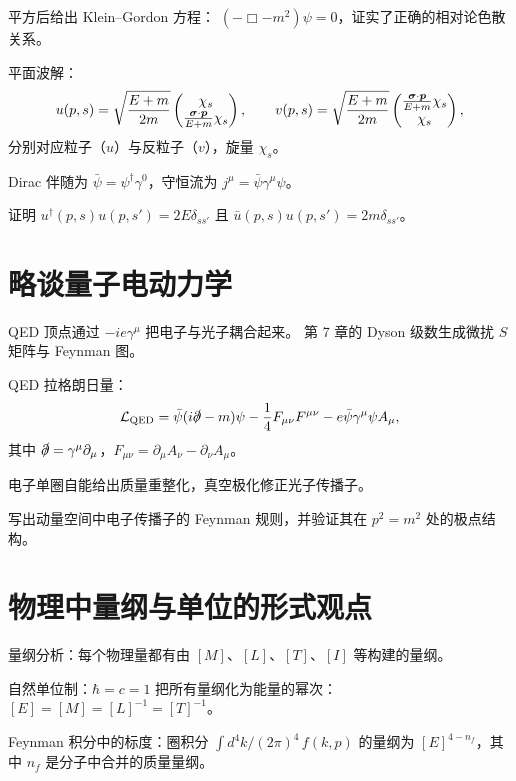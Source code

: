 平方后给出 Klein--Gordon 方程：
$(-\Box-m^2)\psi=0$，证实了正确的相对论色散关系。

平面波解：
\begin{equation}
u(p,s) = \sqrt{\frac{E+m}{2m}}
\begin{pmatrix}\chi_s\\\frac{\bm{\sigma}\cdot\bm{p}}{E+m}\chi_s\end{pmatrix},\qquad
v(p,s) = \sqrt{\frac{E+m}{2m}}
\begin{pmatrix}\frac{\bm{\sigma}\cdot\bm{p}}{E+m}\chi_s\\\chi_s\end{pmatrix},
\label{eq:10.7.2}
\end{equation}
分别对应粒子（$u$）与反粒子（$v$），旋量 $\chi_s$。

Dirac 伴随为 $\bar\psi=\psi^\dagger\gamma^0$，守恒流为 $j^\mu=\bar\psi\gamma^\mu\psi$。

\begin{exercise}
证明 $u^\dagger(p,s)u(p,s')=2E\delta_{ss'}$ 且
$\bar u(p,s)u(p,s')=2m\delta_{ss'}$。
\end{exercise}

\section{略谈量子电动力学}

QED 顶点通过 $-ie\gamma^\mu$ 把电子与光子耦合起来。
第 7 章的 Dyson 级数生成微扰 $S$ 矩阵与 Feynman 图。

QED 拉格朗日量：
\begin{equation}
\mathcal L_{\rm QED} = \bar\psi(i\slashed\partial-m)\psi
- \frac14 F_{\mu\nu}F^{\mu\nu} - e\bar\psi\gamma^\mu\psi A_\mu,
\label{eq:10.8.1}
\end{equation}
其中 $\slashed\partial=\gamma^\mu\partial_\mu$，$F_{\mu\nu}=\partial_\mu A_\nu-\partial_\nu A_\mu$。

电子单圈自能给出质量重整化，真空极化修正光子传播子。

\begin{exercise}
写出动量空间中电子传播子的 Feynman 规则，并验证其在 $p^2=m^2$ 处的极点结构。
\end{exercise}

\section{物理中量纲与单位的形式观点}

量纲分析：每个物理量都有由 $[M]$、$[L]$、$[T]$、$[I]$ 等构建的量纲。

自然单位制：$\hbar=c=1$ 把所有量纲化为能量的幂次：
$[E]=[M]=[L]^{-1}=[T]^{-1}$。

Feynman 积分中的标度：圈积分
$\int d^4k/(2\pi)^4\,f(k,p)$ 的量纲为 $[E]^{4-n_f}$，其中 $n_f$
是分子中合并的质量量纲。

